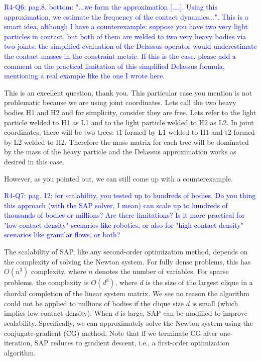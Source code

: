 \vspace{5mm}

\textcolor{blue}{R4-Q6: pag.8, bottom: "...we form the approximation [....].
Using this approximation, we estimate the frequency of the contact dynamics...".
This is a smart idea, although I have a counterexample: suppose you have two
very light particles in contact, but both of them are welded to two very heavy
bodies via two joints: the simplified evaluation of the Delassus operator would
underestimate the contact masses in the constraint metric. If this is the case,
please add a comment on the practical limitation of this simplified Delassus
formula, mentioning a real example like the one I wrote here.}

This is an excellent question, thank you. This particular case you mention is
not problematic because we are using joint coordinates. Lets call the two heavy
bodies H1 and H2 and for simplicity, consider they are free. Lets refer to the
light particle welded to H1 as L1 and to the light particle welded to H2 as L2.
In joint coordinates, there will be two trees: t1 formed by L1 welded to H1 and
t2 formed by L2 welded to H2. Therefore the mass matrix for each tree will be
dominated by the mass of the heavy particle and the Delassus approximation works
as desired in this case.

However, as you pointed out, we can still come up with a counterexample. 


\vspace{5mm}

\textcolor{blue}{R4-Q7: pag. 12: for scalability, you tested up to hundreds of
bodies. Do you thing this approach (with the SAP solver, I mean) can scale up to
hundreds of thousands of bodies or millions? Are there limitations? Is it more
practical for "low contact density" scenarios like robotics, or also for "high
contact density" scenarios like granular flows, or both?}

The scalability of SAP, like any second-order optimization method, depends
on the complexity of solving the Newton system. For fully dense problems,
this has $O(n^3)$ complexity, where $n$ denotes the number of variables. 
For sparse problems, the complexity is $O(d^3)$, where
$d$ is the size of the largest clique in a chordal completion of the 
linear system matrix.  We see no reason the algorithm could not
be applied to millions of bodies if the clique size $d$ is small (which implies
low contact density).  When $d$ is large, SAP can be modified to improve
scalability. Specifically, we can approximately solve the Newton
system using the conjugate-gradient (CG) method. Note that ff we terminate CG after
one-iteration, SAP reduces to gradient descent, i.e., a first-order
optimization algorithm.

